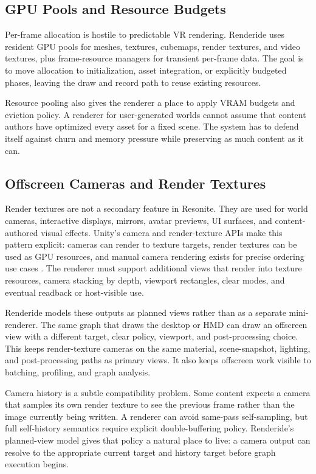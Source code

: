 \documentclass[acmtog,screen,nonacm]{acmart}
\begin{document}
\subsection{GPU Pools and Resource Budgets}

Per-frame allocation is hostile to predictable VR rendering. Renderide uses resident GPU pools for meshes, textures, cubemaps, render textures, and video textures, plus frame-resource managers for transient per-frame data. The goal is to move allocation to initialization, asset integration, or explicitly budgeted phases, leaving the draw and record path to reuse existing resources.

Resource pooling also gives the renderer a place to apply VRAM budgets and eviction policy. A renderer for user-generated worlds cannot assume that content authors have optimized every asset for a fixed scene. The system has to defend itself against churn and memory pressure while preserving as much content as it can.

\subsection{Offscreen Cameras and Render Textures}

Render textures are not a secondary feature in Resonite. They are used for world cameras, interactive displays, mirrors, avatar previews, UI surfaces, and content-authored visual effects. Unity's camera and render-texture APIs make this pattern explicit: cameras can render to texture targets, render textures can be used as GPU resources, and manual camera rendering exists for precise ordering use cases \citep{unityCameraTargetTexture,unityRenderTexture,unityCameraRender}. The renderer must support additional views that render into texture resources, camera stacking by depth, viewport rectangles, clear modes, and eventual readback or host-visible use.

Renderide models these outputs as planned views rather than as a separate mini-renderer. The same graph that draws the desktop or HMD can draw an offscreen view with a different target, clear policy, viewport, and post-processing choice. This keeps render-texture cameras on the same material, scene-snapshot, lighting, and post-processing paths as primary views. It also keeps offscreen work visible to batching, profiling, and graph analysis.

Camera history is a subtle compatibility problem. Some content expects a camera that samples its own render texture to see the previous frame rather than the image currently being written. A renderer can avoid same-pass self-sampling, but full self-history semantics require explicit double-buffering policy. Renderide's planned-view model gives that policy a natural place to live: a camera output can resolve to the appropriate current target and history target before graph execution begins.
\end{document}
